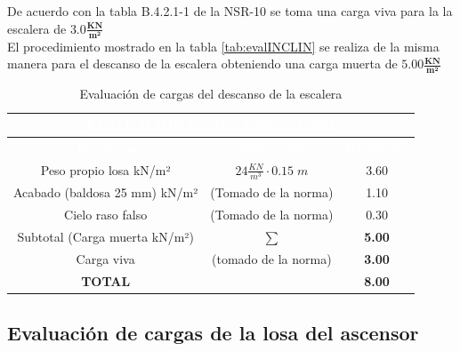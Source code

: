 \documentclass[12pt]{article}
\begin{document}
De acuerdo con la tabla B.4.2.1-1 de la NSR-10 se toma una carga viva para la la escalera de  $\mathbf{3.0 \tfrac{KN}{m^2}}$ \\

El procedimiento mostrado en la tabla \ref{tab:evalINCLIN} se realiza de la misma manera para el descanso de la escalera obteniendo una carga muerta de $\mathbf{5.00\tfrac{KN}{m^2}}$ 

\begin{table}[H]
\centering

\begin{tabular}{|c|c|c|} 
\hline
\multicolumn{3}{|c|}{{\cellcolor[rgb]{ .2,  .247,  .31}}\textcolor{white}{\textbf{EVALUACIÓN CARGAS DESCANSO}}}                                        \\ 
\hline
\rowcolor[rgb]{ .2,  .247,  .31} \textcolor{white}{\textbf{Elemento}} & \textcolor{white}{\textbf{Operación}} & \textcolor{white}{\textbf{Resultado}}  \\ 
\hline
{\cellcolor[rgb]{1,1,1}}Peso propio losa
  kN/m²        & $24\tfrac{KN}{m^3} \cdot 0.15\;m$                                     & 3.60                                   \\ 
\hline
{\cellcolor[rgb]{1,1,1}}Acabado (baldosa 25
  mm) kN/m² & (Tomado de la norma)                                     & 1.10                                   \\ 
\hline
{\cellcolor[rgb]{1,1,1}}Cielo raso falso                    & (Tomado de la norma)                                       & 0.30                                   \\ 
\hline
{\cellcolor[rgb]{1,1,1}}Subtotal (Carga
  muerta kN/m²) & $\mathbf{\sum}$                                     & \textbf{5.00 }                                  \\ 
\hline
{\cellcolor[rgb]{1,1,1}}Carga viva                      & (tomado de la norma)                                     & \textbf{3.00  }                                 \\ 
\hline
{\cellcolor[rgb]{1,1,1}}\textbf{TOTAL}                  & ~                                     & \textbf{8.00   }                                \\
\hline
\end{tabular}
\caption{Evaluación de cargas del descanso de la escalera }
\label{tab:Evaldescanso}
\end{table}




\subsection{Evaluación de cargas de la losa del ascensor}
\end{document}
